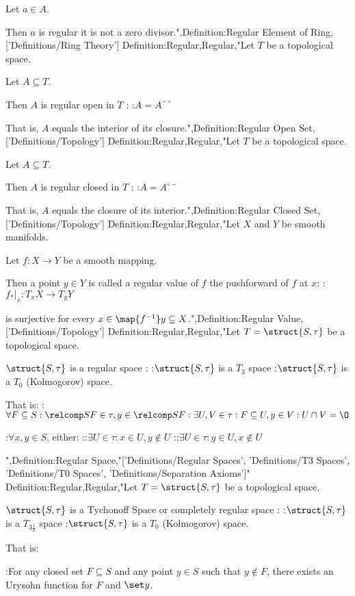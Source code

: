 Let $a \in A$.


Then $a$ is regular  it is not a zero divisor.",Definition:Regular Element of Ring,['Definitions/Ring Theory']
Definition:Regular,Regular,"Let $T$ be a topological space.

Let $A \subseteq T$.


Then $A$ is regular open in $T$ :
:$A = A^{- \circ}$

That is,  $A$ equals the interior of its closure.",Definition:Regular Open Set,['Definitions/Topology']
Definition:Regular,Regular,"Let $T$ be a topological space.

Let $A \subseteq T$.


Then $A$ is regular closed in $T$ :
:$A = A^{\circ -}$

That is,  $A$ equals the closure of its interior.",Definition:Regular Closed Set,['Definitions/Topology']
Definition:Regular,Regular,"Let $X$ and $Y$ be smooth manifolds.

Let $f: X \to Y$ be a smooth mapping.


Then a point $y \in Y$ is called a regular value of $f$  the pushforward of $f$ at $x$:
: $f_* \vert_x: T_x X \to T_y Y$

is surjective for every $x \in \map {f^{-1} } y \subseteq X$.",Definition:Regular Value,['Definitions/Topology']
Definition:Regular,Regular,"Let $T = \struct {S, \tau}$ be a topological space.


$\struct {S, \tau}$ is a regular space :
:$\struct {S, \tau}$ is a $T_3$ space
:$\struct {S, \tau}$ is a $T_0$ (Kolmogorov) space.


That is:
:$\forall F \subseteq S: \relcomp S F \in \tau, y \in \relcomp S F: \exists U, V \in \tau: F \subseteq U, y \in V: U \cap V = \O$ 

:$\forall x, y \in S$, either:
::$\exists U \in \tau: x \in U, y \notin U$
::$\exists U \in \tau: y \in U, x \notin U$


",Definition:Regular Space,"['Definitions/Regular Spaces', 'Definitions/T3 Spaces', 'Definitions/T0 Spaces', 'Definitions/Separation Axioms']"
Definition:Regular,Regular,"Let $T = \struct {S, \tau}$ be a topological space.


$\struct {S, \tau}$ is a Tychonoff Space or completely regular space :
:$\struct {S, \tau}$ is a $T_{3 \frac 1 2}$ space
:$\struct {S, \tau}$ is a $T_0$ (Kolmogorov) space.


That is:

:For any closed set $F \subseteq S$ and any point $y \in S$ such that $y \notin F$, there exists an Urysohn function for $F$ and $\set y$.

